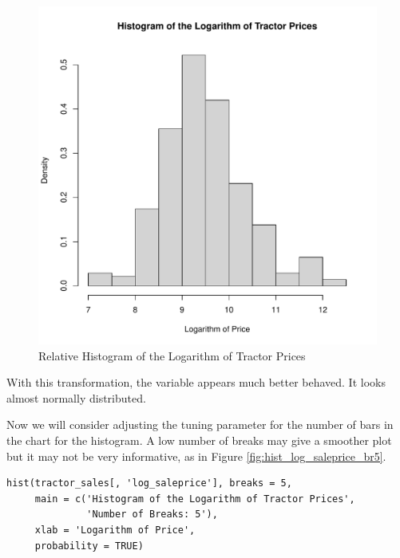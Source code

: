 \begin{figure}[h!]
  \centering
  \includegraphics[scale = 0.5, keepaspectratio=true]{../Figures/hist_log_saleprice}
  \caption{Relative Histogram of the Logarithm of Tractor Prices} \label{fig:hist_log_saleprice}
\end{figure}

With this transformation, the variable appears much better behaved.
It looks almost normally distributed.

Now we will consider adjusting the tuning parameter for the number of
bars in the chart for the histogram.
%
A low number of breaks may give a smoother plot but
it may not be very informative, as in Figure \ref{fig:hist_log_saleprice_br5}.

\begin{verbatim}
hist(tractor_sales[, 'log_saleprice'], breaks = 5,
     main = c('Histogram of the Logarithm of Tractor Prices',
              'Number of Breaks: 5'),
     xlab = 'Logarithm of Price',
     probability = TRUE)
\end{verbatim}


